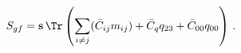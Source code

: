 \begin{equation}
S_{gf} = \mathbf{s}\, \Tr \left( \sum_{i\ne j} (\bar C_{ij} m_{ij}) + \bar
C_{q} q_{23} + \bar C_{00} q_{00} \right)\,.
\end{equation}

